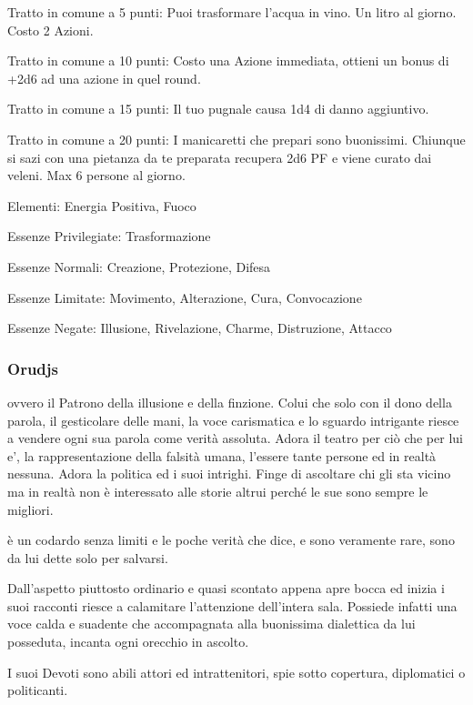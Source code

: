 \documentclass[a4paper,11pt,twoside,openany]{book}
\begin{document}
\bigskip

Tratto in comune a 5 punti: Puoi trasformare l'acqua in vino. Un litro al giorno. Costo 2 Azioni.

Tratto in comune a 10 punti: Costo una Azione immediata, ottieni un bonus di +2d6 ad una azione in quel round.

Tratto in comune a 15 punti: Il tuo pugnale causa 1d4 di danno aggiuntivo.

Tratto in comune a 20 punti: I manicaretti che prepari sono buonissimi. Chiunque si sazi con una pietanza da te preparata recupera 2d6 PF e viene curato dai veleni. Max 6 persone al giorno.

\bigskip

Elementi: Energia Positiva, Fuoco

\bigskip

Essenze Privilegiate: Trasformazione

Essenze Normali: Creazione, Protezione, Difesa

Essenze Limitate: Movimento, Alterazione, Cura, Convocazione

Essenze Negate: Illusione, Rivelazione, Charme, Distruzione, Attacco

\subsubsection{Orudjs}

\label{orudjs}

ovvero il Patrono della illusione e della finzione. Colui che solo con il dono della parola, il gesticolare delle mani, la voce carismatica e lo sguardo intrigante riesce a vendere ogni sua parola come verità assoluta. Adora il teatro per ciò che per lui e', la rappresentazione della falsità umana, l'essere tante persone ed in realtà nessuna. Adora la politica ed i suoi intrighi. Finge di ascoltare chi gli sta vicino ma in realtà non è interessato alle storie altrui perché le sue sono sempre le migliori.

è un codardo senza limiti e le poche verità che dice, e sono veramente rare, sono da lui dette solo per salvarsi.

Dall'aspetto piuttosto ordinario e quasi scontato appena apre bocca ed inizia i suoi racconti riesce a calamitare l'attenzione dell'intera sala. Possiede infatti una voce calda e suadente che accompagnata alla buonissima dialettica da lui posseduta, incanta ogni orecchio in ascolto.

I suoi Devoti sono abili attori ed intrattenitori, spie sotto copertura, diplomatici o politicanti.
\end{document}
